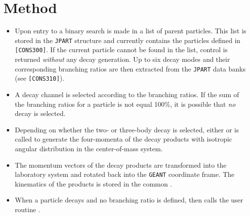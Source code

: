 \section{Method}
\begin{itemize}
\item
Upon entry to  a binary search is made in a list of
parent particles. This list is stored in the {\tt JPART} structure
and currently contains the particles defined in 
{\tt [CONS300]}. If the current particle cannot be found in the list,
control is returned {\it without} any decay generation.
Up to six decay modes and their corresponding branching ratios are then
extracted from the {\tt JPART} data banks (see {\tt [CONS310]}).
\item
A decay channel is selected according to the branching ratios.
If the sum
of the branching ratios for a particle is not equal 100\%, it is
possible that {\it no} decay is selected.
\item
Depending on whether the two- or three-body decay is selected, either
 or  is called to generate the
four-momenta of the decay products with isotropic angular
distribution in the center-of-mass system.
\item
The momentum vectors of the decay products 
are transformed into the laboratory 
system and rotated back into the {\tt GEANT} coordinate frame.
The kinematics of the products is stored in the common .
\item
When a particle decays and no branching ratio is defined, then
calls the user routine .
\end{itemize}
